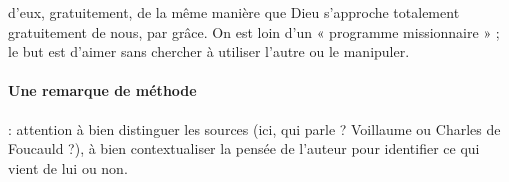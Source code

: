 d’eux, gratuitement, de la même manière que Dieu s’approche totalement gratuitement de nous, par grâce. On est loin d’un « programme missionnaire » ; le but est d’aimer sans chercher à utiliser l’autre ou le manipuler.
\paragraph{Une remarque de méthode} : attention à bien distinguer les sources (ici, qui parle ? Voillaume ou Charles de Foucauld ?), à bien contextualiser la pensée de l’auteur pour identifier ce qui vient de lui ou non.